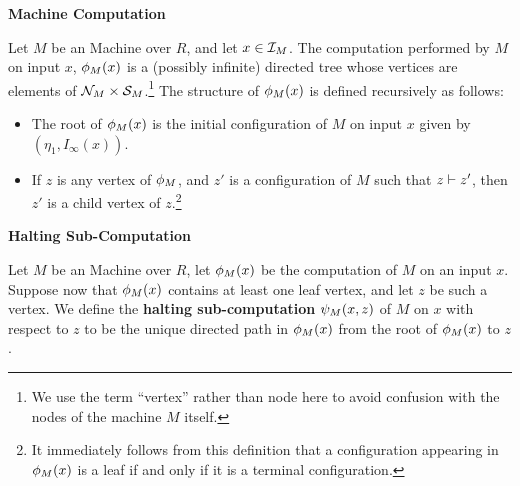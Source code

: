 \begin{definition}{\textbf{\ndet Machine Computation}}
  
  Let $M$ be an \ndet Machine over $R$, and let $x \in \mathcal{I}_M$.
  The computation performed by $M$ on input $x$, $\phi_M(x)$ is a
  (possibly infinite) directed tree whose vertices are elements of
  $\mathcal{N}_M \times \mathcal{S}_M$.\footnote{We use the term ``vertex''
    rather than node here to avoid confusion with the nodes of the
    machine $M$ itself.}  The structure of $\phi_M(x)$ is defined
  recursively as follows:
  
  \begin{itemize}
  \item The root of $\phi_M(x)$ is the initial configuration of
    $M$ on input $x$ given by $(\eta_1, I_\infty(x))$.
    
  \item If $z$ is any vertex of $\phi_M$, and $z'$ is a
    configuration of $M$ such that $z \vdash z'$, then $z'$ is a
    child vertex of $z$.\footnote{It immediately follows from this
      definition that a configuration appearing in $\phi_M(x)$ is
      a leaf if and only if it is a terminal configuration.}
  \end{itemize}
  
\end{definition}



\begin{definition}{\textbf{Halting Sub-Computation}}
  
  Let $M$ be an \ndet Machine over $R$, let $\phi_M(x)$ be the
  computation of $M$ on an input $x$.  Suppose now that
  $\phi_M(x)$ contains at least one leaf vertex, and let $z$ be
  such a vertex.  We define the \textbf{halting sub-computation}
  $\psi_M(x, z)$ of $M$ on $x$ with respect to $z$ to be the
  unique directed path in $\phi_M(x)$ from the root of
  $\phi_M(x)$ to $z$.
  

\end{definition}

